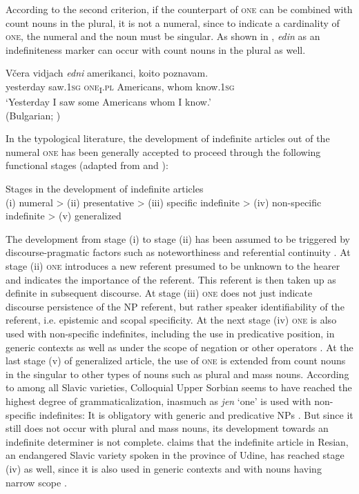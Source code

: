 \documentclass[output=paper,colorlinks,citecolor=brown]{langscibook}
\begin{document}
\noindent According to the second criterion, if the counterpart of \textsc{one} can be combined with count nouns in the plural, it is not a numeral, since to indicate a cardinality of \textsc{one}, the numeral and the noun must be singular. As shown in , \textit{edin} as an indefiniteness marker can occur with count nouns in the plural as well.

\ea\label{geist:ex:bulg-edin3}
\gll Včera vidjach \textit{edni} amerikanci, koito poznavam.\\
yesterday saw.\textsc{1sg} \textsc{one\textsubscript{I}.pl} Americans, whom know.\textsc{1sg}\\
\glt ‘Yesterday I saw some Americans whom I know.’\\\hfill (Bulgarian; \citealt[129]{Geist2013})
\z

\noindent In the typological literature, the development of indefinite articles out of the numeral \textsc{one} has been generally accepted to proceed through the following functional stages (adapted from \citealt{Givon1981} and \citealt{Heine1997a}):

\ea Stages in the development of indefinite articles\label{geist:ex:stages}\\
(i) numeral > (ii) presentative > (iii) specific indefinite > (iv) non-specific indefinite > (v) generalized
\z

\noindent The development from stage (i) to stage (ii) has been assumed to be triggered by discourse-pragmatic factors such as noteworthiness and referential continuity \citep{Givon1983,Wright.Givon1987}. At stage (ii) \textsc{one} introduces a new referent presumed to be unknown to the hearer and indicates the importance of the referent. This referent is then taken up as definite in subsequent discourse. At stage (iii) \textsc{one} does not just indicate discourse persistence of the NP referent, but rather speaker identifiability of the referent, i.e. epistemic and scopal specificity. At the next stage (iv) \textsc{one} is also used with non-specific indefinites, including the use in predicative position, in generic contexts as well as under the scope of negation or other operators \citep{Givon1981,Geist2013}. At the last stage (v) of generalized article, the use of \textsc{one} is extended from count nouns in the singular to other types of nouns such as plural and mass nouns. According to \citet{Wiemer2020} among all Slavic varieties, Colloquial Upper Sorbian seems to have reached the highest degree of grammaticalization, inasmuch as \textit{jen} ‘one’ is used with non-specific indefinites: It is obligatory with generic and predicative NPs . But since it still does not occur with plural and mass nouns, its development towards an indefinite determiner is not complete. \citet{Runic2019} claims that the indefinite article in Resian, an endangered Slavic variety spoken in the province of Udine, has reached stage (iv) as well, since it is also used in generic contexts and with nouns having narrow scope . 
\end{document}
